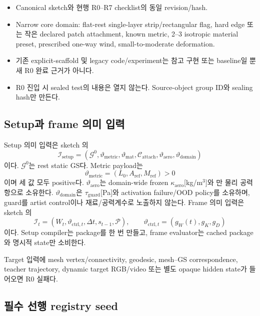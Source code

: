 \documentclass[10pt]{article}
\begin{document}
\begin{itemize}
  \item Canonical sketch와 현행 R0--R7 checklist의 동일 revision/hash.
  \item Narrow core domain: flat-rest single-layer strip/rectangular flag, hard edge 또는 작은 declared patch
  attachment, known metric, 2--3 isotropic material preset, prescribed one-way wind, small-to-moderate deformation.
  \item 기존 explicit-scaffold 및 legacy code/experiment는 참고 구현 또는 baseline일 뿐 새 R0 완료 근거가 아니다.
  \item R0 진입 시 sealed test의 내용은 열지 않는다. Source-object group ID와 sealing hash만 만든다.
\end{itemize}

\subsection{Setup과 frame 의미 입력}

Setup 의미 입력은 sketch 의
\[
  \mathcal I_{\mathrm{setup}}=
  (\mathcal G^0,\vartheta_{\mathrm{metric}},\vartheta_{\mathrm{mat}},
   \mathcal C_{\mathrm{attach}},\vartheta_{\mathrm{aero}},\vartheta_{\mathrm{domain}})
\]
이다. \(\mathcal G^0\)는 rest static GS다. Metric payload는
\[
  \vartheta_{\mathrm{metric}}=(L_0,A_{\mathrm{ref}},M_{\mathrm{ref}})>0
\]
이며 세 값 모두 positive다. \(\vartheta_{\mathrm{aero}}\)는 domain-wide frozen
\(\kappa_{\mathrm{aero}}\)[kg/m\(^3\)]와 만 물리 공력 항으로 소유한다.
\(\vartheta_{\mathrm{domain}}\)은 \(\tau_{\mathrm{guard}}\)[Pa]와 activation failure/OOD policy를 소유하며,
guard를 artist control이나 재료/공력계수로 노출하지 않는다.
Frame 의미 입력은 sketch 의
\[
  \mathcal I_t=(W_t,\vartheta_{\mathrm{ctrl},t},\Delta t,s_{t-1},\mathcal P),
  \qquad \vartheta_{\mathrm{ctrl},t}=(g_W(t),g_K,g_D)
\]
이다. Setup compiler는 package를 한 번 만들고, frame evaluator는 cached package와 명시적 state만 소비한다.

Target 입력에 mesh vertex/connectivity, geodesic, mesh--GS correspondence, teacher trajectory,
dynamic target RGB/video 또는 별도 opaque hidden state가 들어오면 R0 실패다.

\subsection{필수 선행 registry seed}
\end{document}
